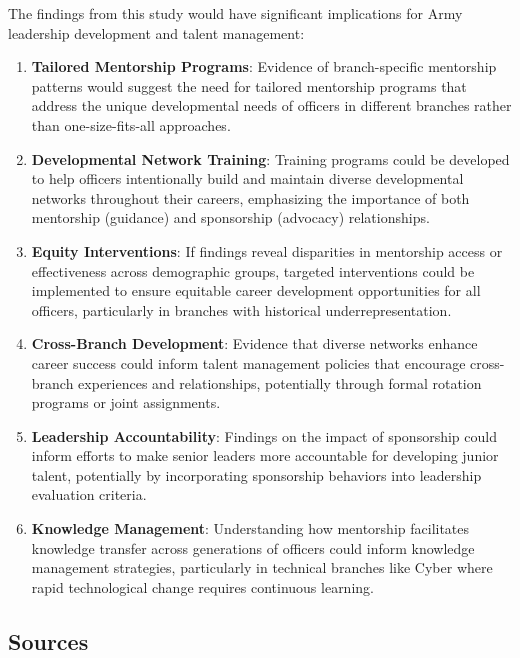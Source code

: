 \documentclass[
  letterpaper,
  DIV=11,
  numbers=noendperiod]{scrartcl}
\begin{document}
The findings from this study would have significant implications for
Army leadership development and talent management:

\begin{enumerate}
\def\labelenumi{\arabic{enumi}.}
\item
  \textbf{Tailored Mentorship Programs}: Evidence of branch-specific
  mentorship patterns would suggest the need for tailored mentorship
  programs that address the unique developmental needs of officers in
  different branches rather than one-size-fits-all approaches.
\item
  \textbf{Developmental Network Training}: Training programs could be
  developed to help officers intentionally build and maintain diverse
  developmental networks throughout their careers, emphasizing the
  importance of both mentorship (guidance) and sponsorship (advocacy)
  relationships.
\item
  \textbf{Equity Interventions}: If findings reveal disparities in
  mentorship access or effectiveness across demographic groups, targeted
  interventions could be implemented to ensure equitable career
  development opportunities for all officers, particularly in branches
  with historical underrepresentation.
\item
  \textbf{Cross-Branch Development}: Evidence that diverse networks
  enhance career success could inform talent management policies that
  encourage cross-branch experiences and relationships, potentially
  through formal rotation programs or joint assignments.
\item
  \textbf{Leadership Accountability}: Findings on the impact of
  sponsorship could inform efforts to make senior leaders more
  accountable for developing junior talent, potentially by incorporating
  sponsorship behaviors into leadership evaluation criteria.
\item
  \textbf{Knowledge Management}: Understanding how mentorship
  facilitates knowledge transfer across generations of officers could
  inform knowledge management strategies, particularly in technical
  branches like Cyber where rapid technological change requires
  continuous learning.
\end{enumerate}

\subsection{Sources}\label{sources}
\end{document}

